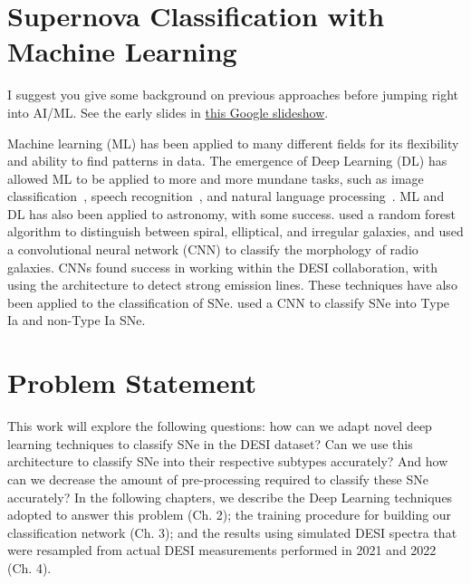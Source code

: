 \section{Supernova Classification with Machine Learning}
\label{sec:supernova-classification-with-machine-learning}


I suggest you give some background on previous approaches before jumping right into AI/ML.
See the early slides in \href{https://docs.google.com/presentation/d/1zqoEVMrWbBP5k41gdjUEKioLE4J0vhu0vAzKEg4pROM/edit?usp=sharing}{this Google slideshow}.

Machine learning (ML) has been applied to many different fields for its flexibility 
and ability to find patterns in data. The emergence of Deep Learning (DL) has
allowed ML to be applied to more and more mundane tasks, such as image
classification~\parencite{krizhevsky2012}, speech recognition~\parencite{Nassif2019},
and natural language processing~\parencite{Mikolov2013}. ML and DL 
has also been applied to astronomy, with some success. \textcite{Gauci2010} used 
a random forest algorithm  to distinguish between spiral, elliptical, and irregular galaxies, 
and \textcite{Becker2021} used a convolutional neural network (CNN) to classify the morphology of
radio galaxies. CNNs found success in working within the DESI collaboration, with 
\textcite{parks2018} using the architecture to detect strong emission lines.  
These techniques have also been applied to the classification of SNe. 
\textcite{Mller2016} used a CNN to classify SNe into Type Ia and non-Type Ia SNe. 

\section{Problem Statement}
This work will explore the following questions: how can we adapt novel deep learning 
techniques to classify SNe in the DESI dataset? Can we use this architecture to 
classify SNe into their respective subtypes accurately? And how can we decrease the amount of 
pre-processing required to classify these SNe accurately? In the following chapters,
we describe the Deep Learning techniques adopted to answer this problem (Ch. 2);
the training procedure for building our classification network (Ch. 3);
and the results using simulated DESI spectra that were resampled from actual 
DESI measurements performed in 2021 and 2022 (Ch. 4).


